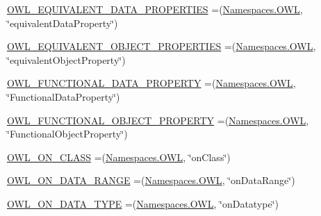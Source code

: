 \begin{DoxyCompactItemize}
\hyperlink{enumorg_1_1semanticweb_1_1owlapi_1_1vocab_1_1_o_w_l_r_d_f_vocabulary_ad7f87fd17a65d5c441026c19d4bac123}{O\-W\-L\-\_\-\-E\-Q\-U\-I\-V\-A\-L\-E\-N\-T\-\_\-\-D\-A\-T\-A\-\_\-\-P\-R\-O\-P\-E\-R\-T\-I\-E\-S} =(\hyperlink{enumorg_1_1semanticweb_1_1owlapi_1_1vocab_1_1_namespaces_a2fcb537074d9307ef1356ffb6a5bd6f4}{Namespaces.\-O\-W\-L}, \char`\"{}equivalent\-Data\-Property\char`\"{})
\item 
\hyperlink{enumorg_1_1semanticweb_1_1owlapi_1_1vocab_1_1_o_w_l_r_d_f_vocabulary_a58a22ff7c0fe5131ae3d2af233b69c99}{O\-W\-L\-\_\-\-E\-Q\-U\-I\-V\-A\-L\-E\-N\-T\-\_\-\-O\-B\-J\-E\-C\-T\-\_\-\-P\-R\-O\-P\-E\-R\-T\-I\-E\-S} =(\hyperlink{enumorg_1_1semanticweb_1_1owlapi_1_1vocab_1_1_namespaces_a2fcb537074d9307ef1356ffb6a5bd6f4}{Namespaces.\-O\-W\-L}, \char`\"{}equivalent\-Object\-Property\char`\"{})
\item 
\hyperlink{enumorg_1_1semanticweb_1_1owlapi_1_1vocab_1_1_o_w_l_r_d_f_vocabulary_a9e55e91ce0ed1fc4c65550863ea1f0f2}{O\-W\-L\-\_\-\-F\-U\-N\-C\-T\-I\-O\-N\-A\-L\-\_\-\-D\-A\-T\-A\-\_\-\-P\-R\-O\-P\-E\-R\-T\-Y} =(\hyperlink{enumorg_1_1semanticweb_1_1owlapi_1_1vocab_1_1_namespaces_a2fcb537074d9307ef1356ffb6a5bd6f4}{Namespaces.\-O\-W\-L}, \char`\"{}Functional\-Data\-Property\char`\"{})
\item 
\hyperlink{enumorg_1_1semanticweb_1_1owlapi_1_1vocab_1_1_o_w_l_r_d_f_vocabulary_a37dc6786e10c7ea9565c0beb229545ca}{O\-W\-L\-\_\-\-F\-U\-N\-C\-T\-I\-O\-N\-A\-L\-\_\-\-O\-B\-J\-E\-C\-T\-\_\-\-P\-R\-O\-P\-E\-R\-T\-Y} =(\hyperlink{enumorg_1_1semanticweb_1_1owlapi_1_1vocab_1_1_namespaces_a2fcb537074d9307ef1356ffb6a5bd6f4}{Namespaces.\-O\-W\-L}, \char`\"{}Functional\-Object\-Property\char`\"{})
\item 
\hyperlink{enumorg_1_1semanticweb_1_1owlapi_1_1vocab_1_1_o_w_l_r_d_f_vocabulary_aa741847d19de488c2fa48a8223d2ef84}{O\-W\-L\-\_\-\-O\-N\-\_\-\-C\-L\-A\-S\-S} =(\hyperlink{enumorg_1_1semanticweb_1_1owlapi_1_1vocab_1_1_namespaces_a2fcb537074d9307ef1356ffb6a5bd6f4}{Namespaces.\-O\-W\-L}, \char`\"{}on\-Class\char`\"{})
\item 
\hyperlink{enumorg_1_1semanticweb_1_1owlapi_1_1vocab_1_1_o_w_l_r_d_f_vocabulary_a85f15da7f212a4f69e4230d5b5d37554}{O\-W\-L\-\_\-\-O\-N\-\_\-\-D\-A\-T\-A\-\_\-\-R\-A\-N\-G\-E} =(\hyperlink{enumorg_1_1semanticweb_1_1owlapi_1_1vocab_1_1_namespaces_a2fcb537074d9307ef1356ffb6a5bd6f4}{Namespaces.\-O\-W\-L}, \char`\"{}on\-Data\-Range\char`\"{})
\item 
\hyperlink{enumorg_1_1semanticweb_1_1owlapi_1_1vocab_1_1_o_w_l_r_d_f_vocabulary_a8ca48f391fa59c65e47c0af7775af2ec}{O\-W\-L\-\_\-\-O\-N\-\_\-\-D\-A\-T\-A\-\_\-\-T\-Y\-P\-E} =(\hyperlink{enumorg_1_1semanticweb_1_1owlapi_1_1vocab_1_1_namespaces_a2fcb537074d9307ef1356ffb6a5bd6f4}{Namespaces.\-O\-W\-L}, \char`\"{}on\-Datatype\char`\"{})

\end{DoxyCompactItemize}
